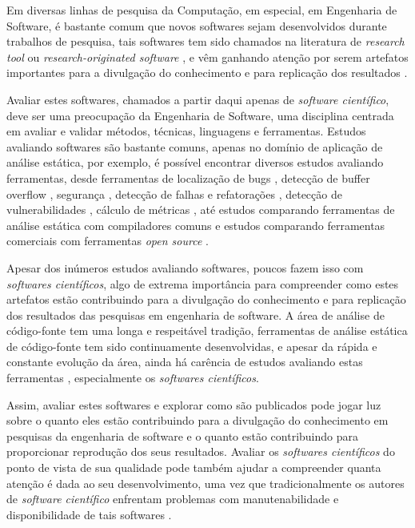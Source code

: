 
Em diversas linhas de pesquisa da Computação, em especial, em Engenharia de
Software, é bastante comum que novos softwares sejam desenvolvidos durante
trabalhos de pesquisa, tais softwares tem sido chamados na literatura de {\it
research tool} \cite{Portillo12} ou {\it research-originated software}
\cite{Kon2011}, e vêm ganhando atenção por serem artefatos importantes para a
divulgação do conhecimento e para replicação dos resultados \cite{Stodden2009}.

Avaliar estes softwares, chamados a partir daqui apenas de {\it software
científico}, deve ser uma preocupação da Engenharia de Software, uma disciplina
centrada em avaliar e validar métodos, técnicas, linguagens e ferramentas.
Estudos avaliando softwares são bastante comuns, apenas no domínio
de aplicação de análise estática, por exemplo, é possível encontrar diversos estudos
avaliando ferramentas, desde ferramentas de localização de bugs \cite{Rutar2004}, detecção
de buffer overflow \cite{Kratkiewicz2005}, segurança \cite{Okun2007,
Johns2011}, detecção de falhas e refatorações \cite{Wedyan2009}, detecção de
vulnerabilidades \cite{Li2010, Ataide2014}, cálculo de métricas
\cite{Alemerien2013}, até estudos comparando ferramentas de análise estática
com compiladores comuns \cite{Emanuelsson2008} e estudos comparando ferramentas
comerciais com ferramentas {\it open source} \cite{Al2010}.


Apesar dos inúmeros estudos avaliando softwares, poucos fazem isso com {\it
softwares científicos}, algo de extrema importância para compreender como estes
artefatos estão contribuindo para a divulgação do conhecimento e para
replicação dos resultados das pesquisas em engenharia de software. A área de
análise de código-fonte tem uma longa e respeitável tradição, ferramentas de
análise estática de código-fonte tem sido continuamente desenvolvidas, e apesar
da rápida e constante evolução da área, ainda há carência de estudos avaliando
estas ferramentas \cite{Li2010}, especialmente os {\it softwares científicos}.

Assim, avaliar estes softwares e explorar como são publicados pode jogar luz
sobre o quanto eles estão contribuindo para a divulgação do conhecimento em
pesquisas da engenharia de software e o quanto estão contribuindo para
proporcionar reprodução dos seus resultados. Avaliar os {\it softwares
científicos} do ponto de vista de sua qualidade pode também ajudar a
compreender quanta atenção é dada ao seu desenvolvimento, uma vez que
tradicionalmente os autores de {\it software científico} enfrentam problemas
com manutenabilidade e disponibilidade de tais softwares \cite{Prlic2012}.

